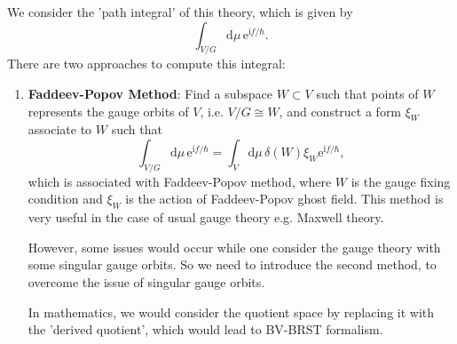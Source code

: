 \documentclass[10pt]{article}
\begin{document}
We consider the 'path integral' of this theory, which is given by
\begin{equation*}
  \int _{V/G} \mathrm{d} \mu \, \mathrm{e}^{\mathrm{i}f / \hbar}.
\end{equation*}
There are two approaches to compute this integral:
\begin{enumerate}[(1)]
  \item \textbf{Faddeev-Popov Method}: Find a subspace $ W \subset V$ such that points of $ W$ represents the gauge orbits of $ V$, i.e. $ V/G \cong W$, and construct a form $ \xi_{W}$ associate to $ W$ such that
    \begin{equation*}
      \int _{V/G} \mathrm{d} \mu \, \mathrm{e}^{\mathrm{i}f / \hbar} = \int _{V} \mathrm{d}\mu \, \delta(W) \xi_{W} \mathrm{e}^{\mathrm{i}f / \hbar},
    \end{equation*}
    which is associated with Faddeev-Popov method, where $ W$ is the gauge fixing condition and $ \xi_{W}$ is the action of Faddeev-Popov ghost field.
    This method is very useful in the case of usual gauge theory e.g. Maxwell theory.

    However, some issues would occur while one consider the gauge theory with some singular gauge orbits.
    So we need to introduce the second method, to overcome the issue of singular gauge orbits.

    In mathematics, we would consider the quotient space by replacing it with the 'derived quotient', which would lead to BV-BRST formalism.


\end{enumerate}
\end{document}
